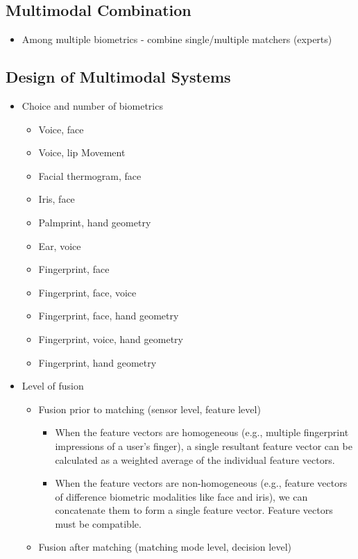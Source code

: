 \documentclass[paper=a4, fontsize=11pt]{scrartcl} %
\numberwithin{equation}{section} %
\numberwithin{figure}{section} %
\numberwithin{table}{section} %
\begin{document}
\subsection{Multimodal Combination}

\begin{itemize}
\item Among multiple biometrics - combine single/multiple matchers (experts)
\end{itemize}

\subsection{Design of Multimodal Systems}

\begin{itemize}
\item Choice and number of biometrics
\begin{itemize}
\item Voice, face
\item Voice, lip Movement
\item Facial thermogram, face
\item Iris, face
\item Palmprint, hand geometry
\item Ear, voice
\item Fingerprint, face
\item Fingerprint, face, voice
\item Fingerprint, face, hand geometry
\item Fingerprint, voice, hand geometry
\item Fingerprint, hand geometry
\end{itemize}
\item Level of fusion
\begin{itemize}
\item Fusion prior to matching (sensor level, feature level)
\begin{itemize}
\item When the feature vectors are homogeneous (e.g., multiple fingerprint impressions of a user's finger), a single resultant feature vector can be calculated as a weighted average of the individual feature vectors.
\item When the feature vectors are non-homogeneous (e.g., feature vectors of difference biometric modalities like face and iris), we can concatenate them to form a single feature vector. Feature vectors must be compatible.
\end{itemize}
\item Fusion after matching (matching mode level, decision level)

\end{itemize}
\end{itemize}
\end{document}
